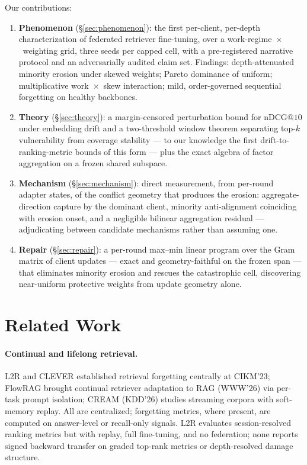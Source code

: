 \documentclass[sigconf,anonymous,review]{acmart}
\makeatletter
\newcommand{\ndcg}{\mathrm{nDCG@10}}
\makeatother
\begin{document}
Our contributions:
\begin{enumerate}
\item \textbf{Phenomenon} (\S\ref{sec:phenomenon}): the first per-client, per-depth characterization of federated retriever fine-tuning, over a work-regime~$\times$~weighting grid, three seeds per capped cell, with a pre-registered narrative protocol and an adversarially audited claim set. Findings: depth-attenuated minority erosion under skewed weights; Pareto dominance of uniform; multiplicative work~$\times$~skew interaction; mild, order-governed sequential forgetting on healthy backbones.
\item \textbf{Theory} (\S\ref{sec:theory}): a margin-censored perturbation bound for $\ndcg$ under embedding drift and a two-threshold window theorem separating top-$k$ vulnerability from coverage stability --- to our knowledge the first drift-to-ranking-metric bounds of this form --- plus the exact algebra of factor aggregation on a frozen shared subspace.
\item \textbf{Mechanism} (\S\ref{sec:mechanism}): direct measurement, from per-round adapter states, of the conflict geometry that produces the erosion: aggregate-direction capture by the dominant client, minority anti-alignment coinciding with erosion onset, and a negligible bilinear aggregation residual --- adjudicating between candidate mechanisms rather than assuming one.
\item \textbf{Repair} (\S\ref{sec:repair}): a per-round max--min linear program over the Gram matrix of client updates --- exact and geometry-faithful on the frozen span --- that eliminates minority erosion and rescues the catastrophic cell, discovering near-uniform protective weights from update geometry alone.
\end{enumerate}

\section{Related Work}\label{sec:related}
\paragraph{Continual and lifelong retrieval.} L2R and CLEVER established retrieval forgetting centrally at CIKM'23; FlowRAG brought continual retriever adaptation to RAG (WWW'26) via per-task prompt isolation; CREAM (KDD'26) studies streaming corpora with soft-memory replay. All are centralized; forgetting metrics, where present, are computed on answer-level or recall-only signals. L2R evaluates session-resolved ranking metrics but with replay, full fine-tuning, and no federation; none reports signed backward transfer on graded top-rank metrics or depth-resolved damage structure.
\end{document}
